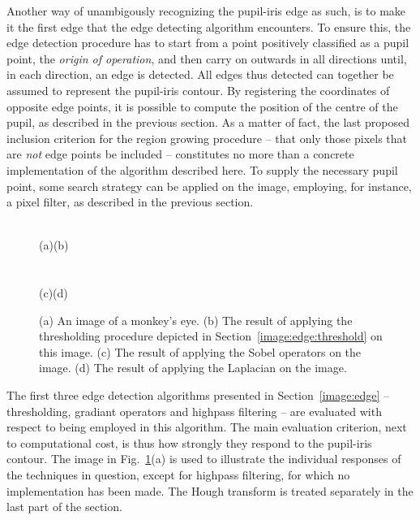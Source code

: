 Another way of unambigously recognizing the pupil-iris edge as such,
is to make it the first edge that the edge detecting algorithm
encounters.  To ensure this, the edge detection procedure has to start
from a point positively classified as a pupil point, the {\em origin
  of operation\/}, and then carry on outwards in all directions until,
in each direction, an edge is detected.  All edges thus detected can
together be assumed to represent the pupil-iris contour.  By
registering the coordinates of opposite edge points, it is possible to
compute the position of the centre of the pupil, as described in the
previous section.  As a matter of fact, the last proposed inclusion
criterion for the region growing procedure -- that only those pixels
that are {\em not\/} edge points be included -- constitutes no more
than a concrete implementation of the algorithm described here.  To
supply the necessary pupil point, some search strategy can be applied
on the image, employing, for instance, a pixel filter, as described in
the previous section.

\begin{figure}[tb]
  \textwidth
  \\
  \hspace*{0.28\textwidth}(a)\hspace*{0.38\textwidth}(b)
  \paragraph{}
  \\
  \hspace*{0.28\textwidth}(c)\hspace*{0.38\textwidth}(d)
  \caption{\label{fig:compare}(a) An image of a monkey's eye.  (b) The
    result of applying the thresholding procedure depicted in
    Section~\protect\ref{image:edge:threshold} on this image.  (c) The
    result of applying the Sobel operators on the image.  (d) The
    result of applying the Laplacian on the image.}
\end{figure}

The first three edge detection algorithms presented in
Section~\ref{image:edge} -- thresholding, gradiant operators and
highpass filtering -- are evaluated with respect to being employed in
this algorithm.  The main evaluation criterion, next to computational
cost, is thus how strongly they respond to the pupil-iris contour. The
image in Fig.~\ref{fig:compare}(a) is used to illustrate the individual
responses of the techniques in question, except for highpass
filtering, for which no implementation has been made.  The Hough
transform is treated separately in the last part of the section.

